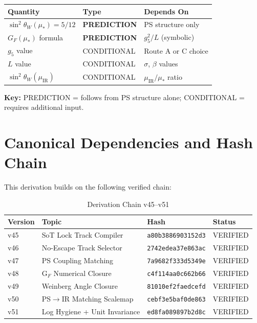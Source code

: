 \documentclass[11pt,a4paper]{article}
\theoremstyle{definition}
\begin{document}
\begin{resultbox}
\begin{center}
\begin{tabular}{@{}lll@{}}
\toprule
\textbf{Quantity} & \textbf{Type} & \textbf{Depends On} \\
\midrule
$\sin^2\theta_W(\mu_*) = 5/12$ & \textbf{PREDICTION} & PS structure only \\
$G_F(\mu_*)$ formula & \textbf{PREDICTION} & $g_5^2/L$ (symbolic) \\
$g_5$ value & CONDITIONAL & Route A or C choice \\
$L$ value & CONDITIONAL & $\sigma$, $\beta$ values \\
$\sin^2\theta_W(\mu_{\text{IR}})$ & CONDITIONAL & $\mu_{\text{IR}}/\mu_*$ ratio \\
\bottomrule
\end{tabular}
\end{center}
\textbf{Key:} PREDICTION = follows from PS structure alone; CONDITIONAL = requires additional input.
\end{resultbox}

\tableofcontents
\newpage

\section{Canonical Dependencies and Hash Chain}
\label{sec:dependencies}

This derivation builds on the following verified chain:

\begin{table}[h]
\centering
\caption{Derivation Chain v45--v51}
\label{tab:hash_chain}
\begin{tabular}{@{}llll@{}}
\toprule
\textbf{Version} & \textbf{Topic} & \textbf{Hash} & \textbf{Status} \\
\midrule
v45 & SoT Lock Track Compiler & \texttt{a80b3886903152d3} & VERIFIED \\
v46 & No-Escape Track Selector & \texttt{2742edea37e863ac} & VERIFIED \\
v47 & PS Coupling Matching & \texttt{7a9682f333d5349e} & VERIFIED \\
v48 & G$_F$ Numerical Closure & \texttt{c4f114aa0c662b66} & VERIFIED \\
v49 & Weinberg Angle Closure & \texttt{81010ef2faedcefd} & VERIFIED \\
v50 & PS$\to$IR Matching Scalemap & \texttt{cebf3e5baf0de863} & VERIFIED \\
v51 & Log Hygiene + Unit Invariance & \texttt{ed8fa089897b2d8c} & VERIFIED \\
\bottomrule
\end{tabular}
\end{table}
\end{document}
